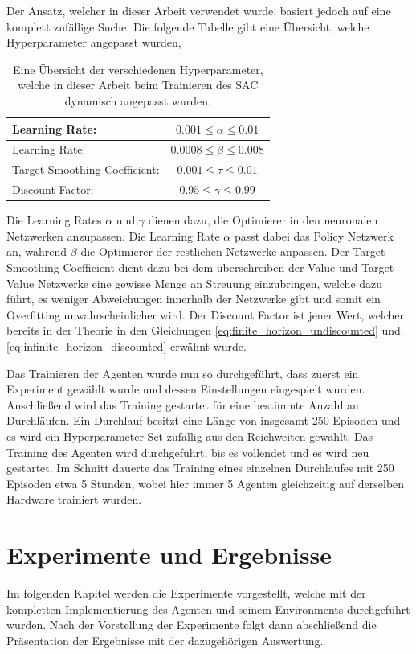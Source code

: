 \documentclass[]{iat}
\begin{document}
Der Ansatz, welcher in dieser Arbeit verwendet wurde, basiert jedoch auf eine komplett zufällige Suche. Die folgende Tabelle gibt eine Übersicht, welche Hyperparameter angepasst wurden,
\begin{table}[H]
    \begin{tabular}{l|c}
        Learning Rate:                & $0.001 \leq \alpha \leq 0.01$  \\ \hline
        Learning Rate:                & $0.0008 \leq \beta \leq 0.008$ \\ \hline
        Target Smoothing Coefficient: & $0.001 \leq \tau \leq 0.01$    \\ \hline
        Discount Factor:              & $0.95 \leq \gamma \leq 0.99$
    \end{tabular}
    \caption{Eine Übersicht der verschiedenen Hyperparameter, welche in dieser Arbeit beim Trainieren des SAC dynamisch angepasst wurden.}
    \label{tab:hps}
\end{table}
Die Learning Rates $\alpha$ und $\gamma$ dienen dazu, die Optimierer in den neuronalen Netzwerken anzupassen. Die Learning Rate $\alpha$ passt dabei das Policy Netzwerk an, während $\beta$ die Optimierer der restlichen Netzwerke anpassen. Der Target Smoothing Coefficient dient dazu bei dem überschreiben der Value und Target-Value Netzwerke eine gewisse Menge an Streuung einzubringen, welche dazu führt, es weniger Abweichungen innerhalb der Netzwerke gibt und somit ein Overfitting unwahrscheinlicher wird. \cite[]{https://doi.org/10.48550/arxiv.1802.09477} Der Discount Factor ist jener Wert, welcher bereits in der Theorie in den Gleichungen \ref{eq:finite_horizon_undiscounted} und \ref{eq:infinite_horizon_discounted} erwähnt wurde.

Das Trainieren der Agenten wurde nun so durchgeführt, dass zuerst ein Experiment gewählt wurde und dessen Einstellungen eingespielt wurden. Anschließend wird das Training gestartet für eine bestimmte Anzahl an Durchläufen. Ein Durchlauf besitzt eine Länge von insgesamt 250 Episoden und es wird ein Hyperparameter Set zufällig aus den Reichweiten gewählt. Das Training des Agenten wird durchgeführt, bis es vollendet und es wird neu gestartet. Im Schnitt dauerte das Training eines einzelnen Durchlaufes mit 250 Episoden etwa 5 Stunden, wobei hier immer 5 Agenten gleichzeitig auf derselben Hardware trainiert wurden.


\chapter{Experimente und Ergebnisse} \label{sec:ergebnisse}
Im folgenden Kapitel werden die Experimente vorgestellt, welche mit der kompletten Implementierung des Agenten und seinem Environments durchgeführt wurden. Nach der Vorstellung der Experimente folgt dann abschließend die Präsentation der Ergebnisse mit der dazugehörigen Auswertung.
\end{document}
